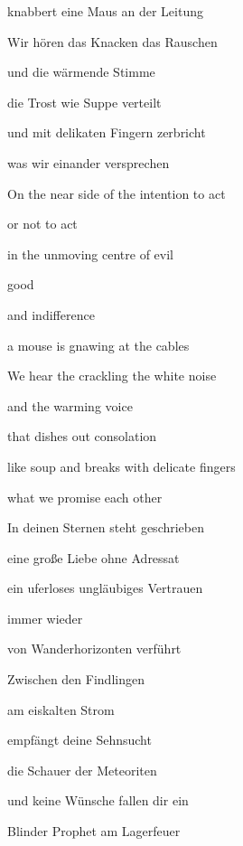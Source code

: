 \documentclass[a4paper]{article}
\begin{document}
\bigskip

knabbert eine Maus an der Leitung

Wir hören das Knacken das Rauschen

und die wärmende Stimme

die Trost wie Suppe verteilt

und mit delikaten Fingern zerbricht

was wir einander versprechen


\bigskip



\bigskip

On the near side of the intention to act

or not to act

in the unmoving centre of evil

good

and indifference


\bigskip

a mouse is gnawing at the cables

We hear the crackling the white noise

and the warming voice

that dishes out consolation

like soup and breaks with delicate fingers 

what we promise each other


\bigskip


\bigskip



\bigskip


\bigskip

In deinen Sternen steht geschrieben

eine große Liebe ohne Adressat

ein uferloses ungläubiges Vertrauen

immer wieder

von Wanderhorizonten verführt


\bigskip

Zwischen den Findlingen

am eiskalten Strom

empfängt deine Sehnsucht

die Schauer der Meteoriten

und keine Wünsche fallen dir ein


\bigskip

Blinder Prophet am Lagerfeuer
\end{document}
